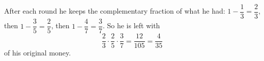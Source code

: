After each round he keeps the complementary fraction of what he had: $1-\dfrac13=\dfrac23$, then $1-\dfrac35=\dfrac25$, then $1-\dfrac47=\dfrac37$. So he is left with
\[\dfrac23\cdot\dfrac25\cdot\dfrac37=\dfrac{12}{105}=\boxed{\dfrac{4}{35}}\]
of his original money.
